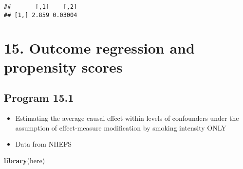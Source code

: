 \documentclass[10pt,]{book}
\newenvironment{Shaded}{\begin{snugshade}}{\end{snugshade}}
\newcommand{\KeywordTok}[1]{\textcolor[rgb]{0.13,0.29,0.53}{\textbf{#1}}}
\newcommand{\NormalTok}[1]{#1}
\providecommand{\tightlist}{%
  \setlength{\itemsep}{0pt}\setlength{\parskip}{0pt}}
\begin{document}
\begin{verbatim}
##       [,1]    [,2]
## [1,] 2.859 0.03004
\end{verbatim}

\hypertarget{outcome-regression-and-propensity-scores}{%
\chapter*{15. Outcome regression and propensity scores}\label{outcome-regression-and-propensity-scores}}

\hypertarget{program-15.1}{%
\section{Program 15.1}\label{program-15.1}}

\begin{itemize}
\tightlist
\item
  Estimating the average causal effect within levels of confounders under the assumption of effect-measure modification by smoking intensity ONLY
\item
  Data from NHEFS
\end{itemize}

\begin{Shaded}
\begin{Highlighting}[]
\KeywordTok{library}\NormalTok{(here)}
\end{Highlighting}
\end{Shaded}
\end{document}
